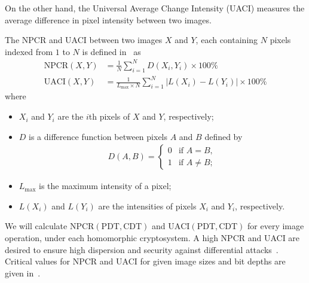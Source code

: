 \begin{description}
		On the other hand, the Universal Average Change Intensity (UACI) measures the average difference in pixel intensity between two images.

		The NPCR and UACI between two images $X$ and $Y$, each containing $N$ pixels indexed from $1$ to $N$ is defined in~\cite{wu_npcr_2011} as
		\begin{align}
            \mathrm{NPCR}(X,Y) &= \frac{1}{N}\sum_{i = 1}^{N}{D(X_i,Y_i)} \times 100\%\\
            \mathrm{UACI}(X,Y) &= \frac{1}{L_{\max} \times N} \sum_{i = 1}^{N}{ |L(X_i) - L(Y_i)| } \times 100\%
		\end{align}
		where
		\begin{itemize}
			\item $X_i$ and $Y_i$ are the $i$th pixels of $X$ and $Y$, respectively;
			\item $D$ is a difference function between pixels $A$ and $B$ defined by
			\begin{align}
				D(A,B) =
				\begin{cases}
					0 &  \text{if $A = B$},\\
					1 &  \text{if $A \neq B$};
				\end{cases}
			\end{align}
		\item $L_{\max}$ is the maximum intensity of a pixel;
		\item $L(X_i)$ and $L(Y_i)$ are the intensities of pixels $X_i$ and $Y_i$, respectively.
		\end{itemize}
        We will calculate $\mathrm{NPCR}(\mathrm{PDT},\mathrm{CDT})$ and $\mathrm{UACI}(\mathrm{PDT},\mathrm{CDT})$  for every image operation, under each homomorphic cryptosystem. A high NPCR and UACI are desired to ensure high dispersion and security against differential attacks~\cite{ahmed_benchmark_2016}. Critical values for NPCR and UACI for given image sizes and bit depths are given in~\cite{wu_npcr_2011}.
\end{description}




